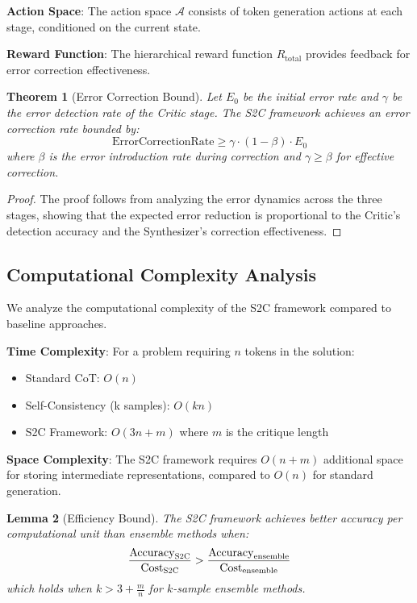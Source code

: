 \documentclass[10pt,twocolumn]{article}
\newtheorem{theorem}{Theorem}
\newtheorem{lemma}[theorem]{Lemma}
\newcommand{\ssc}{\textsc{S2C}}
\begin{document}
\textbf{Action Space}: The action space $\mathcal{A}$ consists of token generation actions at each stage, conditioned on the current state.

\textbf{Reward Function}: The hierarchical reward function $R_{\text{total}}$ provides feedback for error correction effectiveness.

\begin{theorem}[Error Correction Bound]
\label{thm:error_bound}
Let $E_0$ be the initial error rate and $\gamma$ be the error detection rate of the Critic stage. The \ssc{} framework achieves an error correction rate bounded by:
\begin{equation}
\text{ErrorCorrectionRate} \geq \gamma \cdot (1 - \beta) \cdot E_0
\end{equation}
where $\beta$ is the error introduction rate during correction and $\gamma \geq \beta$ for effective correction.
\end{theorem}

\begin{proof}
The proof follows from analyzing the error dynamics across the three stages, showing that the expected error reduction is proportional to the Critic's detection accuracy and the Synthesizer's correction effectiveness.
\end{proof}

\subsection{Computational Complexity Analysis}

We analyze the computational complexity of the \ssc{} framework compared to baseline approaches.

\textbf{Time Complexity}: For a problem requiring $n$ tokens in the solution:
\begin{itemize}[leftmargin=*]
\item Standard CoT: $O(n)$
\item Self-Consistency (k samples): $O(kn)$
\item \ssc{} Framework: $O(3n + m)$ where $m$ is the critique length
\end{itemize}

\textbf{Space Complexity}: The \ssc{} framework requires $O(n + m)$ additional space for storing intermediate representations, compared to $O(n)$ for standard generation.

\begin{lemma}[Efficiency Bound]
\label{lemma:efficiency}
The \ssc{} framework achieves better accuracy per computational unit than ensemble methods when:
\begin{equation}
\frac{\text{Accuracy}_{\ssc{}}}{\text{Cost}_{\ssc{}}} > \frac{\text{Accuracy}_{\text{ensemble}}}{\text{Cost}_{\text{ensemble}}}
\end{equation}
which holds when $k > 3 + \frac{m}{n}$ for $k$-sample ensemble methods.
\end{lemma}
\end{document}
